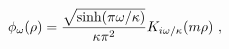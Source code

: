 \begin{equation}\label{2.22a}
\phi_\omega(\rho)=
{\sqrt{\sinh (\pi \omega/\kappa)} \over \kappa \pi^2}
K_{i\omega/\kappa}(m\rho)~,
\end{equation}

